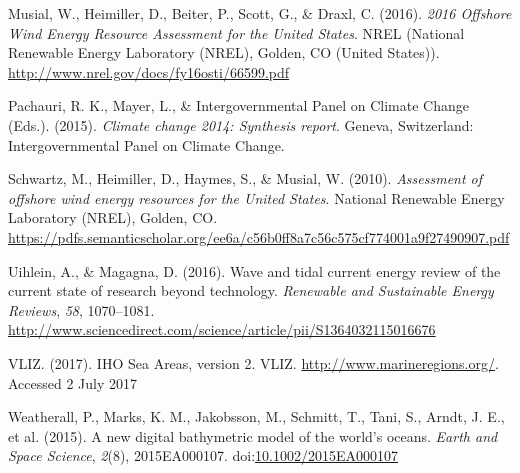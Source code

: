 \documentclass[]{article}
\begin{document}
\leavevmode\hypertarget{ref-musial_2016_2016}{}%
Musial, W., Heimiller, D., Beiter, P., Scott, G., \& Draxl, C. (2016).
\emph{2016 Offshore Wind Energy Resource Assessment for the United
States}. NREL (National Renewable Energy Laboratory (NREL), Golden, CO
(United States)). \url{http://www.nrel.gov/docs/fy16osti/66599.pdf}

\leavevmode\hypertarget{ref-pachauri_climate_2015}{}%
Pachauri, R. K., Mayer, L., \& Intergovernmental Panel on Climate Change
(Eds.). (2015). \emph{Climate change 2014: Synthesis report}. Geneva,
Switzerland: Intergovernmental Panel on Climate Change.

\leavevmode\hypertarget{ref-schwartz_assessment_2010a}{}%
Schwartz, M., Heimiller, D., Haymes, S., \& Musial, W. (2010).
\emph{Assessment of offshore wind energy resources for the United
States}. National Renewable Energy Laboratory (NREL), Golden, CO.
\url{https://pdfs.semanticscholar.org/ee6a/c56b0ff8a7c56c575cf774001a9f27490907.pdf}

\leavevmode\hypertarget{ref-uihlein_wave_2016}{}%
Uihlein, A., \& Magagna, D. (2016). Wave and tidal current energy review
of the current state of research beyond technology. \emph{Renewable and
Sustainable Energy Reviews}, \emph{58}, 1070--1081.
\url{http://www.sciencedirect.com/science/article/pii/S1364032115016676}

\leavevmode\hypertarget{ref-vliz_iho_2017}{}%
VLIZ. (2017). IHO Sea Areas, version 2. VLIZ.
\url{http://www.marineregions.org/}. Accessed 2 July 2017

\leavevmode\hypertarget{ref-weatherall_new_2015}{}%
Weatherall, P., Marks, K. M., Jakobsson, M., Schmitt, T., Tani, S.,
Arndt, J. E., et al. (2015). A new digital bathymetric model of the
world's oceans. \emph{Earth and Space Science}, \emph{2}(8),
2015EA000107.
doi:\href{https://doi.org/10.1002/2015EA000107}{10.1002/2015EA000107}
\end{document}
